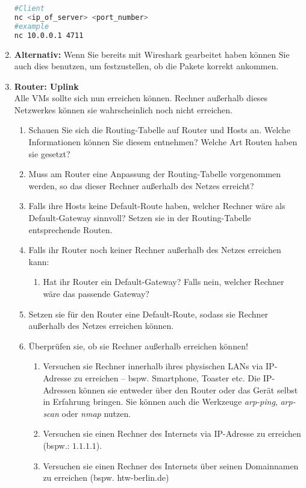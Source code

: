 \documentclass[paper=a4,fontsize=11pt]{scrartcl}%
\begin{document}
\begin{enumerate}
		\begin{lstlisting}[style=Bash, language=Bash, label={netcat_client}]
#Client 
nc <ip_of_server> <port_number>
#example
nc 10.0.0.1 4711
		\end{lstlisting}
		\item \textbf{Alternativ:} Wenn Sie bereits mit Wireshark gearbeitet haben können Sie auch dies benutzen, um festzustellen, ob die Pakete korrekt ankommen. 
	\item \textbf{Router: Uplink}\\
	Alle VMs sollte sich nun erreichen können. Rechner außerhalb dieses Netzwerkes können sie wahrscheinlich noch nicht erreichen.
	\begin{enumerate}
		\item Schauen Sie sich die Routing-Tabelle auf Router und Hosts an. Welche Informationen können Sie diesem entnehmen? Welche Art Routen haben sie gesetzt?
        \item Muss am Router eine Anpassung der Routing-Tabelle vorgenommen werden, so das dieser Rechner außerhalb des Netzes erreicht?
        \item Falls ihre Hosts keine Default-Route haben, welcher Rechner wäre als Default-Gateway sinnvoll? Setzen sie in der Routing-Tabelle entsprechende Routen.
        \item Falls ihr Router noch keiner Rechner außerhalb des Netzes erreichen kann:
        \begin{enumerate}
        		\item Hat ihr Router ein Default-Gateway? Falls nein, welcher Rechner wäre das passende Gateway?
        \end{enumerate}
        \item Setzen sie für den Router eine Default-Route, sodass sie Rechner außerhalb des Netzes erreichen können.
        \item Überprüfen sie, ob sie Rechner außerhalb erreichen können!
     	\begin{enumerate}
     		\item Versuchen sie Rechner innerhalb ihres physischen LANs via IP-Adresse zu erreichen -- bspw. Smartphone, Toaster etc. Die IP-Adressen können sie entweder über den Router oder das Gerät selbst in Erfahrung bringen. Sie können auch die Werkzeuge \emph{arp-ping}, \emph{arp-scan} oder \emph{nmap} nutzen.
     		\item Versuchen sie einen Rechner des Internets via IP-Adresse zu erreichen (bspw.: $1.1.1.1$).
     		\item Versuchen sie einen Rechner des Internets über seinen Domainnamen zu erreichen (bspw. htw-berlin.de)

\end{enumerate}
\end{enumerate}
\end{enumerate}
\end{document}
